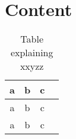 \section{Content}
\label{xyz}

\begin{table}[H]
    \centering
    \caption{Table explaining xxyzz}
    \begin{tabular}{|c|c|c|c|}
    \hline
        a & b & c  \\ \hline \hline
         a & b & c\\ \hline
         a & b & c\\ \hline
    \end{tabular}
    \label{tab:capital_port}
\end{table}

